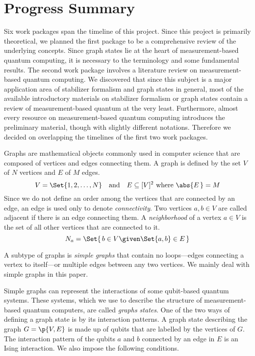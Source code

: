 \section{Progress Summary}

Six work packages span the timeline of this project. Since this project is primarily theoretical, we planned the first package to be a comprehensive review of the underlying concepts. Since graph states lie at the heart of measurement-based quantum computing, it is necessary to the terminology and some fundamental results. The second work package involves a literature review on measurement-based quantum computing. We discovered that since this subject is a major application area of stabilizer formalism and graph states in general, most of the available introductory materials on stabilizer formalism or graph states contain a review of measurement-based quantum at the very least. Furthermore, almost every resource on measurement-based quantum computing introduces the preliminary material, though with slightly different notations. Therefore we decided on overlapping the timelines of the first two work packages. 

Graphs are mathematical objects commonly used in computer science that are composed of vertices and edges connecting them\cite{clrs}. A graph is defined by the set \(V\) of \(N\) vertices and \(E\) of \(M\) edges.
\begin{equation}
  V = \Set{1, 2, \dots, N} \quad\text{and}\quad E \subseteq [V]^2 \text{ where } \abs{E\,} = M
\end{equation}
Since we do not define an order among the vertices that are connected by an edge, an edge is used only to denote \emph{connectivity}. Two vertices \(a, b \in V\) are called adjacent if there is an edge connecting them. A \emph{neighborhood} of a vertex \(a \in V\) is the set of all other vertices that are connected to it. 
\begin{equation}
  N_a = \Set{\,b\in V \given \Set{a, b}\in E\,}
\end{equation}

A subtype of graphs is \emph{simple graphs} that contain no loops---edges connecting a vertex to itself---or multiple edges between any two vertices\cite{hein2006}. We mainly deal with simple graphs in this paper. 

Simple graphs can represent the interactions of some qubit-based quantum systems. These systems, which we use to describe the structure of measurement-based quantum computers, are called \emph{graphs states}. One of the two ways of defining a graph state is by its interaction patterns. A graph state describing the graph \(G=\p{V, E}\) is made up of qubits that are labelled by the vertices of \(G\). The interaction pattern of the qubits \(a\) and \(b\) connected by an edge in \(E\) is an Ising interaction. We also impose the following conditions.

